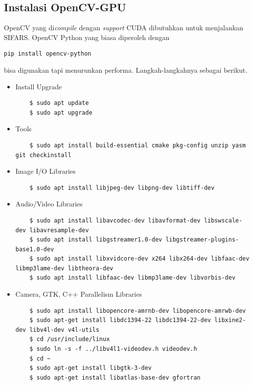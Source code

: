 \subsection{Instalasi OpenCV-GPU}
OpenCV yang di\textit{compile} dengan \textit{support} CUDA dibutuhkan untuk menjalankan SIFARS.
OpenCV Python yang biasa diperoleh dengan 
\begin{lstlisting}
pip install opencv-python 
\end{lstlisting} bisa digunakan tapi menurunkan performa. Langkah-langkahnya sebagai berikut.

\begin{itemize}
  \item Install Upgrade
  
  \begin{lstlisting}
    $ sudo apt update
    $ sudo apt upgrade
  \end{lstlisting}

  \item Tools
  
  \begin{lstlisting}
    $ sudo apt install build-essential cmake pkg-config unzip yasm git checkinstall
  \end{lstlisting}
  
  \item Image I/O Libraries
  
  \begin{lstlisting}
    $ sudo apt install libjpeg-dev libpng-dev libtiff-dev
  \end{lstlisting}

  \item Audio/Video Libraries
  
  \begin{lstlisting}
    $ sudo apt install libavcodec-dev libavformat-dev libswscale-dev libavresample-dev
    $ sudo apt install libgstreamer1.0-dev libgstreamer-plugins-base1.0-dev
    $ sudo apt install libxvidcore-dev x264 libx264-dev libfaac-dev libmp3lame-dev libtheora-dev 
    $ sudo apt install libfaac-dev libmp3lame-dev libvorbis-dev
  \end{lstlisting}

  \item Camera, GTK, C++ Parallelism Libraries
  
  \begin{lstlisting}
    $ sudo apt install libopencore-amrnb-dev libopencore-amrwb-dev
    $ sudo apt-get install libdc1394-22 libdc1394-22-dev libxine2-dev libv4l-dev v4l-utils
    $ cd /usr/include/linux
    $ sudo ln -s -f ../libv4l1-videodev.h videodev.h
    $ cd ~
    $ sudo apt-get install libgtk-3-dev
    $ sudo apt-get install libatlas-base-dev gfortran
  \end{lstlisting}


\end{itemize}
